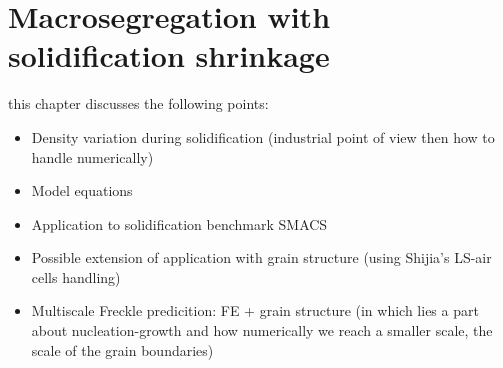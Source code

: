 \chapter{Macrosegregation with solidification shrinkage}
\begin{nolinkcolors} 
\minitoc
\end{nolinkcolors}
\newpage

this chapter discusses the following points:
\begin{itemize}
\item Density variation during solidification (industrial point of view then how to handle numerically)
\item Model equations
\item Application to solidification benchmark SMACS
\item Possible extension of application with grain structure (using Shijia's LS-air cells handling)
\item Multiscale Freckle predicition: FE + grain structure (in which lies a part about nucleation-growth and how numerically 
		we reach a smaller scale, the scale of the grain boundaries)
\end{itemize}

